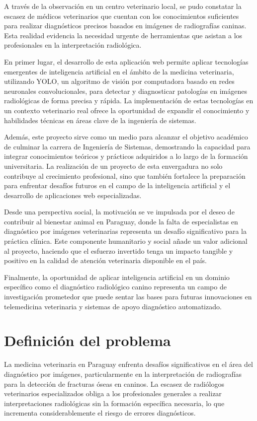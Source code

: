 A través de la observación en un centro veterinario local, se pudo constatar la escasez de médicos veterinarios que cuentan con los conocimientos suficientes para realizar diagnósticos precisos basados en imágenes de radiografías caninas. Esta realidad evidencia la necesidad urgente de herramientas que asistan a los profesionales en la interpretación radiológica.

En primer lugar, el desarrollo de esta aplicación web permite aplicar tecnologías emergentes de inteligencia artificial en el ámbito de la medicina veterinaria, utilizando YOLO, un algoritmo de visión por computadora basado en redes neuronales convolucionales, para detectar y diagnosticar patologías en imágenes radiológicas de forma precisa y rápida. La implementación de estas tecnologías en un contexto veterinario real ofrece la oportunidad de expandir el conocimiento y habilidades técnicas en áreas clave de la ingeniería de sistemas.

Además, este proyecto sirve como un medio para alcanzar el objetivo académico de culminar la carrera de Ingeniería de Sistemas, demostrando la capacidad para integrar conocimientos teóricos y prácticos adquiridos a lo largo de la formación universitaria. La realización de un proyecto de esta envergadura no solo contribuye al crecimiento profesional, sino que también fortalece la preparación para enfrentar desafíos futuros en el campo de la inteligencia artificial y el desarrollo de aplicaciones web especializadas.

Desde una perspectiva social, la motivación se ve impulsada por el deseo de contribuir al bienestar animal en Paraguay, donde la falta de especialistas en diagnóstico por imágenes veterinarias representa un desafío significativo para la práctica clínica. Este componente humanitario y social añade un valor adicional al proyecto, haciendo que el esfuerzo invertido tenga un impacto tangible y positivo en la calidad de atención veterinaria disponible en el país.

Finalmente, la oportunidad de aplicar inteligencia artificial en un dominio específico como el diagnóstico radiológico canino representa un campo de investigación prometedor que puede sentar las bases para futuras innovaciones en telemedicina veterinaria y sistemas de apoyo diagnóstico automatizado.

\section{Definición del problema}
La medicina veterinaria en Paraguay enfrenta desafíos significativos en el área del diagnóstico por imágenes, particularmente en la interpretación de radiografías para la detección de fracturas óseas en caninos. La escasez de radiólogos veterinarios especializados obliga a los profesionales generales a realizar interpretaciones radiológicas sin la formación específica necesaria, lo que incrementa considerablemente el riesgo de errores diagnósticos.


